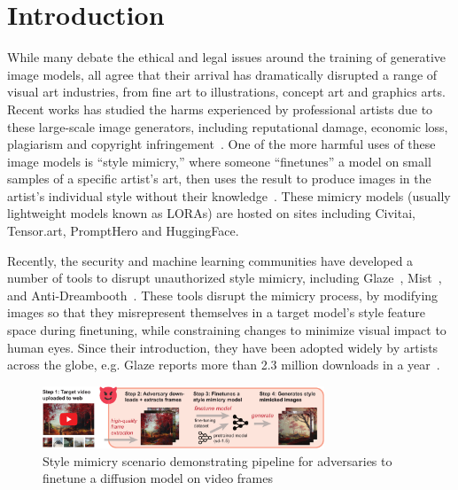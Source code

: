 \secspace
\section{Introduction}
\label{sec:intro}

While many debate the ethical and legal issues around the training of
generative image models, all agree that their arrival has dramatically
disrupted a range of visual art industries, from fine art to illustrations,
concept art and graphics arts. Recent works has studied the harms experienced
by professional artists due to these large-scale image generators, including
reputational damage, economic loss, plagiarism and copyright
infringement~\cite{genaiimpact,genaiimpact2}.  One of the more harmful uses
of these image models is ``style mimicry,'' where someone ``finetunes'' a
model on small samples of a specific artist's art, then uses the result to
produce images in the artist's individual style without their
knowledge~\cite{hollie-steal,sarah-andersen,lensa-steal,sam-steal}. These
mimicry models (usually lightweight models known as LORAs) are hosted on
sites including Civitai, Tensor.art, PromptHero and HuggingFace.

Recently, the security and machine learning communities have developed a
number of tools to disrupt unauthorized style mimicry, including
Glaze~\cite{shan2023glaze}, Mist~\cite{mist}, and
Anti-Dreambooth~\cite{antidb}. These tools disrupt the mimicry process, by
modifying images so that they misrepresent themselves in a target model's
style feature space during finetuning, while constraining changes to
minimize visual impact to human eyes.  Since their introduction, they have
been adopted widely by artists across the globe, e.g. Glaze reports more
than 2.3 million downloads in a year~\cite{shan2023glazewebsite}. 

\begin{figure}[t]
    \centering
    \includegraphics[width=0.75\textwidth]{plots/style-mimicry-scenario-eps-converted-to.pdf}
    \vspace{-0.1in}
    \caption{Style mimicry scenario demonstrating pipeline for adversaries to finetune a diffusion model on video frames}
    \label{fig:style-mimicry-scenario}
  \end{figure}
  

